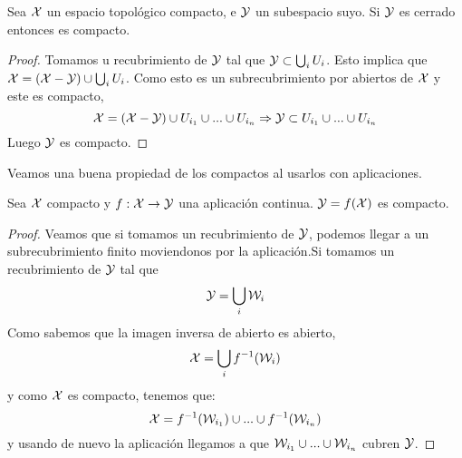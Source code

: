 \begin{prop}
	\label{cerra_en_comp_comp}
	Sea $\mathcal{X}$ un espacio topológico compacto, e $\mathcal{Y}$ un subespacio suyo. Si $\mathcal{Y}$ es cerrado entonces es compacto.
	\begin{proof}
		Tomamos u recubrimiento de $\mathcal{Y}$ tal que $\mathcal{Y} \subset \bigcup_{i}U_i$. Esto implica que $\mathcal{X} = (\mathcal{X}-\mathcal{Y}) \cup \bigcup_{i}U_i$. Como esto es un subrecubrimiento por abiertos de $\mathcal{X}$ y este es compacto,
		\begin{equation}
			\mathcal{X} = (\mathcal{X}-\mathcal{Y}) \cup U_{i_1} \cup ... \cup U_{i_n} \Rightarrow \mathcal{Y} \subset U_{i_1} \cup ... \cup U_{i_n}
		\end{equation}
		Luego $\mathcal{Y}$ es compacto.
	\end{proof}
\end{prop}


Veamos una buena propiedad de los compactos al usarlos con aplicaciones.


\begin{prop}
	\label{comp_comp_comp}
	Sea $\mathcal{X}$ compacto y $f:\mathcal{X} \rightarrow \mathcal{Y}$ una aplicación continua. $\mathcal{Y} = f(\mathcal{X})$ es compacto.
	\begin{proof}
		Veamos que si tomamos un recubrimiento de $\mathcal{Y}$, podemos llegar a un subrecubrimiento finito moviendonos por la aplicación.Si tomamos un recubrimiento de $\mathcal{Y}$ tal que
		\begin{equation}
			\mathcal{Y} = \bigcup_{i}\mathcal{W}_i
		\end{equation}
		Como sabemos que la imagen inversa de abierto es abierto,
		\begin{equation}
			\mathcal{X} = \bigcup_{i}f^{-1}(\mathcal{W}_i)
		\end{equation}
		y como $\mathcal{X}$ es compacto, tenemos que:
		\begin{equation}
			\mathcal{X}  = f^{-1}(\mathcal{W}_{i_1}) \cup ... \cup f^{-1}(\mathcal{W}_{i_n})
		\end{equation}
		y usando de nuevo la aplicación llegamos a que $\mathcal{W}_{i_1} \cup ... \cup \mathcal{W}_{i_n}$ cubren $\mathcal{Y}$.
	\end{proof}
\end{prop}


